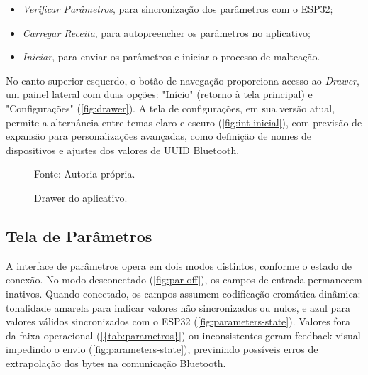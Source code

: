 \begin{itemize}
    \item \textit{Verificar Parâmetros}, para sincronização dos parâmetros com o ESP32;
    \item \textit{Carregar Receita}, para autopreencher os parâmetros no aplicativo;
    \item \textit{Iniciar}, para enviar os parâmetros e iniciar o processo de malteação.
\end{itemize}

No canto superior esquerdo, o botão de navegação proporciona acesso ao \textit{Drawer}, um painel lateral com duas opções: "Início" (retorno à tela principal) e "Configurações" (\autoref{fig:drawer}). A tela de configurações, em sua versão atual, permite a alternância entre temas claro e escuro (\autoref{fig:int-inicial}), com previsão de expansão para personalizações avançadas, como definição de nomes de dispositivos e ajustes dos valores de UUID Bluetooth.

\begin{figure}[ht]
    \caption{Drawer do aplicativo.}
    \label{fig:drawer}
    \centering
    \hfill
    \hfill

    {\centering\footnotesize Fonte: Autoria própria.\par}

  \end{figure}

\subsection{Tela de Parâmetros}\label{subsec:parametros}
A interface de parâmetros opera em dois modos distintos, conforme o estado de conexão. No modo desconectado (\autoref{fig:par-off}), os campos de entrada permanecem inativos. Quando conectado, os campos assumem codificação cromática dinâmica: tonalidade amarela para indicar valores não sincronizados ou nulos, e azul para valores válidos sincronizados com o ESP32 (\autoref{fig:parameters-state}). Valores fora da faixa operacional (\autoref{{tab:parametros}}) ou inconsistentes geram feedback visual impedindo o envio (\autoref{fig:parameters-state}), previnindo possíveis erros de extrapolação dos bytes na comunicação Bluetooth.

